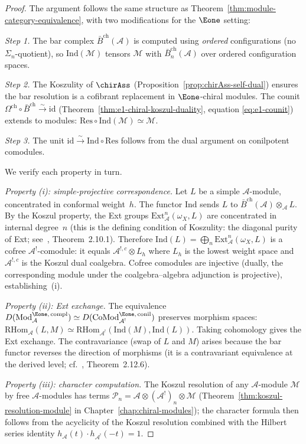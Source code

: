 \begin{proof}
The argument follows the same structure as
Theorem~\ref{thm:module-category-equivalence}, with two
modifications for the $\Eone$ setting:

\emph{Step 1.}
The bar complex $\bar{B}^{\mathrm{ch}}(\mathcal{A})$ is computed
using \emph{ordered} configurations (no $\Sigma_n$-quotient), so
$\mathrm{Ind}(\mathcal{M})$ tensors $\mathcal{M}$ with
$\bar{B}^{\mathrm{ch}}_n(\mathcal{A})$ over ordered
configuration spaces.

\emph{Step 2.}
The Koszulity of $\chirAss$
(Proposition~\ref{prop:chirAss-self-dual}) ensures the bar
resolution is a cofibrant replacement in $\Eone$-chiral modules.
The counit $\Omega^{\mathrm{ch}} \circ \bar{B}^{\mathrm{ch}}
\xrightarrow{\sim} \mathrm{id}$
(Theorem~\ref{thm:e1-chiral-koszul-duality}, equation
\eqref{eq:e1-counit}) extends to modules:
$\mathrm{Res} \circ \mathrm{Ind}(\mathcal{M}) \simeq \mathcal{M}$.

\emph{Step 3.}
The unit
$\mathrm{id} \xrightarrow{\sim}
\mathrm{Ind} \circ \mathrm{Res}$
follows from the dual argument on conilpotent comodules.

We verify each property in turn.

\emph{Property (i): simple-projective correspondence.}
Let $L$ be a simple $\mathcal{A}$-module, concentrated in conformal
weight~$h$.  The functor $\mathrm{Ind}$ sends $L$ to
$\bar{B}^{\mathrm{ch}}(\mathcal{A}) \otimes_{\mathcal{A}} L$.
By the Koszul property, the Ext groups
$\mathrm{Ext}^n_{\mathcal{A}}(\omega_X, L)$ are concentrated in
internal degree~$n$ (this is the defining condition of Koszulity:
the diagonal purity of Ext; see~\cite{BGS96}, Theorem~2.10.1).
Therefore
$\mathrm{Ind}(L) = \bigoplus_n \mathrm{Ext}^n_{\mathcal{A}}(\omega_X, L)$
is a cofree $\mathcal{A}^!$-comodule: it equals
$\mathcal{A}^{!,c} \otimes L_h$ where $L_h$ is the lowest weight space
and $\mathcal{A}^{!,c}$ is the Koszul dual coalgebra.
Cofree comodules are injective (dually, the corresponding module under
the coalgebra--algebra adjunction is projective), establishing~(i).

\emph{Property (ii): Ext exchange.}
The equivalence
$D(\mathrm{Mod}^{\Eone,\,\mathrm{compl}}_{\mathcal{A}})
\simeq
D(\mathrm{CoMod}^{\Eone,\,\mathrm{conil}}_{\mathcal{A}^!})$
preserves morphism spaces:
$\mathrm{RHom}_{\mathcal{A}}(L, M) \simeq
\mathrm{RHom}_{\mathcal{A}^!}(\mathrm{Ind}(M), \mathrm{Ind}(L))$.
Taking cohomology gives the Ext exchange.  The contravariance
(swap of $L$ and $M$) arises because the bar functor reverses
the direction of morphisms (it is a contravariant equivalence
at the derived level; cf.~\cite{BGS96}, Theorem~2.12.6).

\emph{Property (iii): character computation.}
The Koszul resolution of any
$\mathcal{A}$-module $\mathcal{M}$ by free
$\mathcal{A}$-modules has terms
$\mathcal{P}_n = \mathcal{A} \otimes (\mathcal{A}^!)_n
\otimes \mathcal{M}$
(Theorem~\ref{thm:koszul-resolution-module} in
Chapter~\ref{chap:chiral-modules}); the character formula then
follows from the acyclicity of the Koszul resolution combined
with the Hilbert series identity $h_{\mathcal{A}}(t) \cdot
h_{\mathcal{A}^!}(-t) = 1$.
\end{proof}


